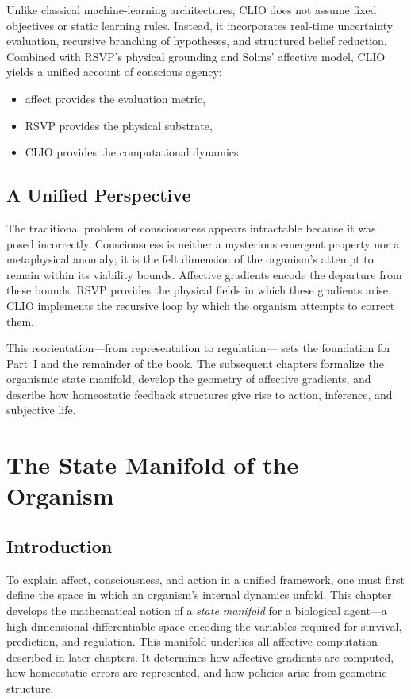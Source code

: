\documentclass[12pt,oneside]{book}
\theoremstyle{plain}
\theoremstyle{definition}
\begin{document}
Unlike classical machine-learning architectures,
CLIO does not assume fixed objectives or static learning rules.
Instead, it incorporates real-time uncertainty evaluation, recursive
branching of hypotheses, and structured belief reduction.
Combined with RSVP’s physical grounding and Solms’ affective model,
CLIO yields a unified account of conscious agency:
\begin{itemize}
    \item affect provides the evaluation metric,
    \item RSVP provides the physical substrate,
    \item CLIO provides the computational dynamics.
\end{itemize}

\section{A Unified Perspective}

The traditional problem of consciousness appears intractable because it
was posed incorrectly.
Consciousness is neither a mysterious emergent property nor a metaphysical
anomaly; it is the felt dimension of the organism’s attempt to remain
within its viability bounds.
Affective gradients encode the departure from these bounds.
RSVP provides the physical fields in which these gradients arise.
CLIO implements the recursive loop by which the organism attempts to
correct them.

This reorientation---from representation to regulation---
sets the foundation for Part~I and the remainder of the book.
The subsequent chapters formalize the organismic state manifold,
develop the geometry of affective gradients, and describe how homeostatic
feedback structures give rise to action, inference, and subjective life.

\chapter{The State Manifold of the Organism}

\section{Introduction}

To explain affect, consciousness, and action in a unified framework, one must
first define the space in which an organism’s internal dynamics unfold.
This chapter develops the mathematical notion of a \emph{state manifold} for a
biological agent---a high-dimensional differentiable space encoding the
variables required for survival, prediction, and regulation.
This manifold underlies all affective computation described in later chapters.
It determines how affective gradients are computed, how homeostatic errors are
represented, and how policies arise from geometric structure.
\end{document}
